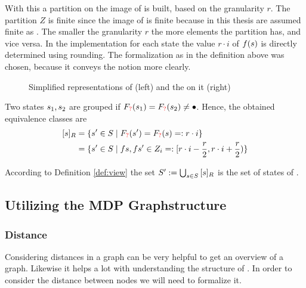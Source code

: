 \documentclass[preview]{standalone}
\begin{document}
With this \viewN a partition on the image of \propfct is built, based on the granularity $r$. The partition $Z$ is finite since the image of \propfct is finite because \mdpsN in this thesis are assumed finite as . The smaller the granularity $r$ the more elements the partition has, and vice versa. In the implementation for each state \state the value $r \cdot i$ of ${f}({s})$ is directly determined using rounding. The formalization as in the definition above was chosen, because it conveys the notion more clearly.
\begin{figure}[h]
	\begin{minipage}{.6\textwidth}
		
	\end{minipage}%
	\begin{minipage}{.5\textwidth}
		
	\end{minipage}
	\caption{Simplified representations of \mdp (left) and the \viewN \viewatomicprops on it (right)}
	\label{fig:PropBeforeAfter}  
\end{figure}

Two states ${s}_1, {s}_2$ are grouped if ${{F_{{{\color{red}?}}}}}({s}_1) = {{F_{{{\color{red}?}}}}}({s}_2) \neq {\bullet}$. Hence, the obtained equivalence classes are
\begin{align*}
	{\ensuremath{{[{s}]_{{R}}}}} &= \{{s}' \in {S} \mid {\ensuremath{{F_{{{\color{red}?}}}}}}({s}') = {{F_{{{\color{red}?}}}}}({s}) =: r \cdot i\} \\
	&= \{{s}' \in {S} \mid {f}{\ensuremath{{s}}}, {f}{{s}'} \in Z_i =: [r \cdot i - \frac{r}{2}, r \cdot i + \frac{r}{2})\}
\end{align*}

According to Definition \ref{def:view} the set ${S}' := \bigcup_{{s} \in {S}} {{[{s}]_{{R}}}}$ is the set of states of \viewprop.


\subsection{Utilizing the MDP Graphstructure}
\subsubsection{Distance}
Considering distances in a graph can be very helpful to get an overview of a graph. Likewise it helps a lot with understanding the structure of \achgphN. In order to consider the distance between nodes we will need to formalize it.
\end{document}
